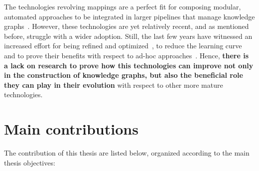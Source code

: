 The technologies revolving mappings are a perfect fit for composing modular, automated approaches to be integrated in larger pipelines that manage knowledge graphs~\citep{simsek2021knowledge,cimmino2022helio,grassi2023composable}. However, these technologies are yet relatively recent, and as mentioned before, struggle with a wider adoption. Still, the last few years have witnessed an increased effort for being refined and optimized~\citep{calvanese2017ontop,chaves2019parameters,arenas2022morphkgc,iglesias2023scaling}, to reduce the learning curve and to prove their benefits with respect to ad-hoc approaches~\citep{iglesias2019bio2rdf}. Hence, \textbf{there is a lack on research to prove how this technologies can improve not only in the construction of knowledge graphs, but also the beneficial role they can play in their evolution} with respect to other more mature technologies.  


\section{Main contributions}

The contribution of this thesis are listed below, organized according to the main thesis objectives:

